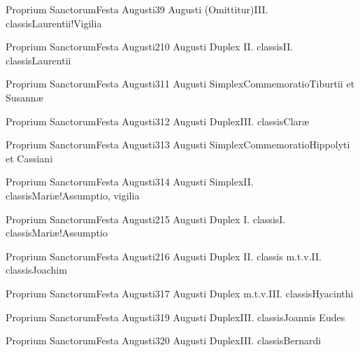 \documentclass[psalterium-feriale.tex]{subfiles}
\begin{document}
	{Proprium Sanctorum}{Festa Augusti}{3}{9 Augusti}
	{(Omittitur)}{III. classis}{Laurentii!Vigilia}
	{}
	{}
\invitferia

	{Proprium Sanctorum}{Festa Augusti}{2}{10 Augusti}
	{Duplex II. classis}{II. classis}{Laurentii}
	{}
	{}
\psalmodiapropria

	{Proprium Sanctorum}{Festa Augusti}{3}{11 Augusti}
	{Simplex}{Commemoratio}{Tiburtii et Susannæ}
	{}
	{}

	{Proprium Sanctorum}{Festa Augusti}{3}{12 Augusti}
	{Duplex}{III. classis}{Claræ}
	{}
	{}

	{Proprium Sanctorum}{Festa Augusti}{3}{13 Augusti}
	{Simplex}{Commemoratio}{Hippolyti et Cassiani}
	{}
	{}

	{Proprium Sanctorum}{Festa Augusti}{3}{14 Augusti}
	{Simplex}{II. classis}{Mariæ!Assumptio, vigilia}
	{}
	{}
\invitferia

	{Proprium Sanctorum}{Festa Augusti}{2}{15 Augusti}
	{Duplex I. classis}{I. classis}{Mariæ!Assumptio}
	{}
	{}
\psalmodiapropria
{}

	{Proprium Sanctorum}{Festa Augusti}{2}{16 Augusti}
	{Duplex II. classis m.t.v.}{II. classis}{Joachim}
	{}
	{}
\psalmodiapropria

	{Proprium Sanctorum}{Festa Augusti}{3}{17 Augusti}
	{Duplex m.t.v.}{III. classis}{Hyacinthi}
	{}
	{}

	{Proprium Sanctorum}{Festa Augusti}{3}{19 Augusti}
	{Duplex}{III. classis}{Joannis Eudes}
	{}
	{}

	{Proprium Sanctorum}{Festa Augusti}{3}{20 Augusti}
	{Duplex}{III. classis}{Bernardi}
	{}
	{}
\end{document}
